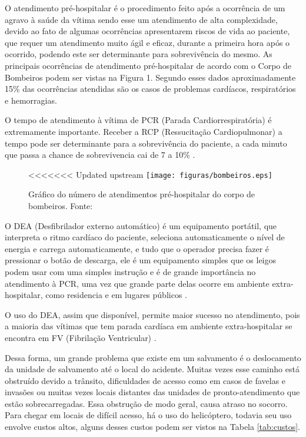 O atendimento pré-hospitalar é o procedimento feito após a ocorrência de um agravo à saúde da vítima \cite{SBC} sendo esse um atendimento de alta complexidade, 
devido ao fato de algumas ocorrências apresentarem riscos de vida ao paciente, que requer um atendimento muito ágil e eficaz, durante a primeira hora após o ocorrido, 
podendo este ser determinante para sobrevivência do mesmo.\cite{PQA} 
As principais ocorrências de atendimento pré-hospitalar de acordo com o Corpo de Bombeiros podem ser vistas na Figura 1. Segundo esses dados aproximadamente 15\% das ocorrências atendidas são os casos de problemas cardíacos, respiratórios e hemorragias.


O tempo de atendimento à vítima de PCR (Parada Cardiorrespiratória) é extremamente importante. Receber a RCP (Ressucitação Cardiopulmonar) a tempo pode ser determinante para a sobrevivência do paciente, a cada minuto que passa a chance de sobrevivencia cai de 7 a 10\% \cite{SBC}. 
 \begin{figure}[H]
<<<<<<< Updated upstream
	\centering
		\texttt{[image: figuras/bombeiros.eps]}
	\caption[Gráfico do número de atendimentos pré-hospitalar do corpo de bombeiros]{Gráfico do número de atendimentos pré-hospitalar do corpo de bombeiros. Fonte: \cite{bombeiro}}
\end{figure}

O DEA (Desfibrilador externo automático) é um equipamento portátil, que interpreta o ritmo cardíaco do paciente, seleciona automaticamente o nível de energia e carrega automaticamente, e tudo que o operador precisa fazer é pressionar o botão de descarga, ele é um equipamento simples que os leigos podem usar com uma simples instrução e é de grande importância no atendimento à PCR, uma vez que grande parte delas ocorre em ambiente extra-hospitalar, como residencia e em lugares públicos \cite{SBC}.

O uso do DEA, assim que disponível, permite maior sucesso no atendimento, pois a maioria das vítimas que tem parada cardíaca em ambiente extra-hospitalar se encontra em FV (Fibrilação Ventricular) \cite{SBC}.

Dessa forma, um grande  problema  que existe em um salvamento é o deslocamento da unidade de salvamento até o local do acidente. Muitas vezes esse caminho está obstruído devido a trânsito, dificuldades de acesso como em casos de favelas e invasões ou muitas vezes locais distantes das unidades de pronto-atendimento que estão sobrecarregadas. Essa obstrução de modo geral, causa atraso no socorro.
Para chegar em locais de difícil acesso, há o uso do helicóptero, todavia seu uso envolve custos altos, alguns desses custos podem ser vistos
na Tabela \ref{tab:custos}.

